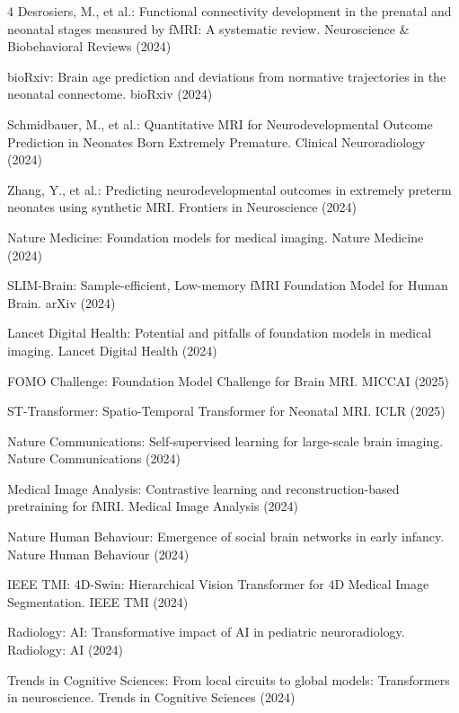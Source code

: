 \documentclass[runningheads,a4paper]{llncs}
\begin{document}
\begin{thebibliography}{4}
 Desrosiers, M., et al.: Functional connectivity development in the prenatal and neonatal stages measured by fMRI: A systematic review. Neuroscience \& Biobehavioral Reviews (2024)

 bioRxiv: Brain age prediction and deviations from normative trajectories in the neonatal connectome. bioRxiv (2024)

 Schmidbauer, M., et al.: Quantitative MRI for Neurodevelopmental Outcome Prediction in Neonates Born Extremely Premature. Clinical Neuroradiology (2024)

 Zhang, Y., et al.: Predicting neurodevelopmental outcomes in extremely preterm neonates using synthetic MRI. Frontiers in Neuroscience (2024)

 Nature Medicine: Foundation models for medical imaging. Nature Medicine (2024)

 SLIM-Brain: Sample-efficient, Low-memory fMRI Foundation Model for Human Brain. arXiv (2024)

 Lancet Digital Health: Potential and pitfalls of foundation models in medical imaging. Lancet Digital Health (2024)

 FOMO Challenge: Foundation Model Challenge for Brain MRI. MICCAI (2025)

 ST-Transformer: Spatio-Temporal Transformer for Neonatal MRI. ICLR (2025)

 Nature Communications: Self-supervised learning for large-scale brain imaging. Nature Communications (2024)

 Medical Image Analysis: Contrastive learning and reconstruction-based pretraining for fMRI. Medical Image Analysis (2024)

 Nature Human Behaviour: Emergence of social brain networks in early infancy. Nature Human Behaviour (2024)

 IEEE TMI: 4D-Swin: Hierarchical Vision Transformer for 4D Medical Image Segmentation. IEEE TMI (2024)

 Radiology: AI: Transformative impact of AI in pediatric neuroradiology. Radiology: AI (2024)

 Trends in Cognitive Sciences: From local circuits to global models: Transformers in neuroscience. Trends in Cognitive Sciences (2024)

\end{thebibliography}
\end{document}

